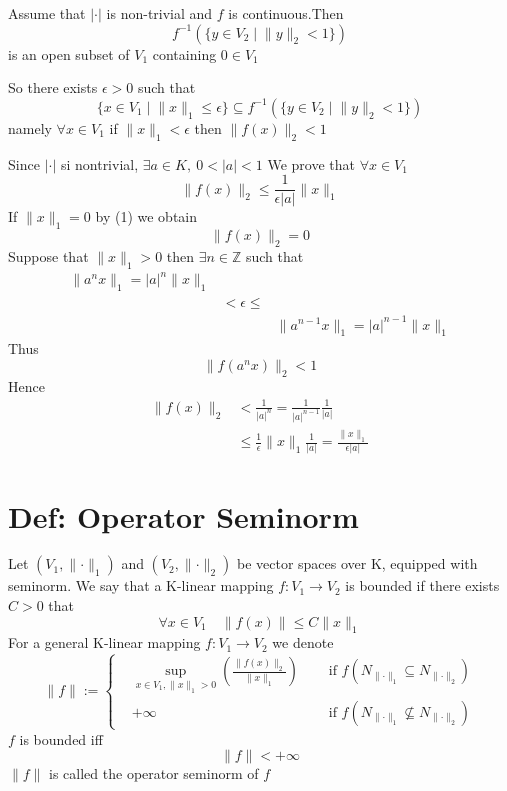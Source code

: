 \documentclass{book}
\begin{document}
\begin{itemize}
        Assume that $\lvert\cdot\rvert$ is non-trivial and $f$ is continuous.Then $$f^{-1}(\{y\in V_2\mid\lVert y\rVert _2 <1\})$$ is an open subset of $V_1$ containing $0\in V_1$

        So there exists $\epsilon>0$ such that $$\{x\in V_1\mid\lVert x\rVert _1\leq\epsilon\}\subseteq f^{-1}(\{y\in V_2\mid\lVert y\rVert _2 <1\})$$
        namely $\forall x\in V_1$ if $\lVert x\rVert _1<\epsilon$ then $\lVert f(x)\rVert _2<1$

        Since $\lvert\cdot\rvert$ si nontrivial, $\exists a\in K,\ 0<\lvert a\rvert<1$ We prove that $\forall x\in V_1$$$\lVert f(x)\rVert _2\leq \frac{1}{\epsilon\lvert a\rvert}\lVert x\rVert _1$$
        If $\lVert x\rVert _1=0$ by (1) we obtain $$\lVert f(x)\rVert _2=0$$
        Suppose that $\lVert x\rVert _1>0$ then $\exists n\in \mathbb{Z}$ such that $$\begin{aligned}
            \lVert a^nx\rVert _1=\lvert a\rvert^n\lVert x\rVert _1&&\\
            &<\epsilon\leq&\\
            &&\lVert a^{n-1}x\rVert _1=\lvert a\rvert^{n-1}\lVert x\rVert _1
        \end{aligned}$$
        Thus $$\lVert f(a^nx)\rVert _2<1$$
        Hence $$\begin{aligned}
        \lVert f(x)\rVert _2 &<\frac{1}{\lvert a\rvert^n}=\frac{1}{\lvert a\rvert^{n-1}}\frac{1}{\lvert a\rvert}\\
        &\leq\frac{1}{\epsilon}\lVert x\rVert _1\frac{1}{\lvert a\rvert}=\frac{\lVert x\rVert _1}{\epsilon\lvert a\rvert}
        \end{aligned}$$
\end{itemize}
\section{Def: Operator Seminorm}
Let $(V_1,\lVert\cdot\rVert _1)$ and $(V_2,\lVert\cdot\rVert _2)$ be vector spaces over K, equipped with seminorm. We say that a K-linear mapping $f:V_1\rightarrow V_2$ is bounded if there exists $C>0$ that $$\forall x\in V_1\quad \lVert f(x)\rVert \leq C\lVert x\rVert _1$$
For a general K-linear mapping $f:V_1\rightarrow V_2$ we denote 
$$\lVert f\rVert :=\left\{\begin{aligned}
    &\sup\limits_{x\in V_1,\lVert x\rVert _1>0}(\frac{\lVert f(x)\rVert _2}{\lVert x\rVert _1})\quad &\text{ if }f(N_{\lVert\cdot\rVert _1}\subseteq N_{\lVert\cdot\rVert _2})\\
    &+\infty &\text{ if }f(N_{\lVert\cdot\rVert _1}\nsubseteq N_{\lVert\cdot\rVert _2})
\end{aligned}\right.$$
$f$ is bounded iff $$\lVert f\rVert<+\infty$$
$\lVert f\rVert$ is called the operator seminorm of $f$
\end{document}
